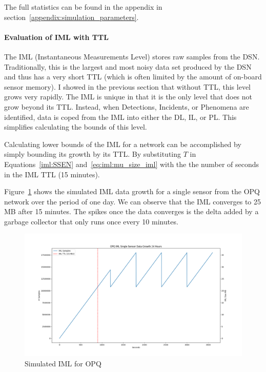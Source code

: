 The full statistics can be found in the appendix in section~\ref{appendix:simulation_parameters}.

\paragraph{Evaluation of IML with TTL}
The IML (Instantaneous Measurements Level) stores raw samples from the DSN. Traditionally, this is the largest and most noisy data set produced by the DSN and thus has a very short TTL (which is often limited by the amount of on-board sensor memory). I showed in the previous section that without TTL, this level grows very rapidly. The IML is unique in that it is the only level that does not grow beyond its TTL. Instead, when Detections, Incidents, or Phenomena are identified, data is coped from the IML into either the DL, IL, or PL. This simplifies calculating the bounds of this level.

Calculating lower bounds of the IML for a network can be accomplished by simply bounding its growth by its TTL\@. By substituting $T$ in Equations~\ref{iml:SSEN} and~\ref{eq:iml:mu_size_iml} with the the number of seconds in the IML TTL (15 minutes).

Figure~\ref{fig:sim_iml_opq} shows the simulated IML data growth for a single sensor from the OPQ network over the period of one day. We can observe that the IML converges to 25 MB after 15 minutes. The spikes once the data converges is the delta added by a garbage collector that only runs once every 10 minutes.

\begin{figure}[H]
	\centering
	\includegraphics[width=\linewidth]{figures/sim_iml_opq.png}
	\caption{Simulated IML for OPQ}
	\label{fig:sim_iml_opq}
\end{figure}


